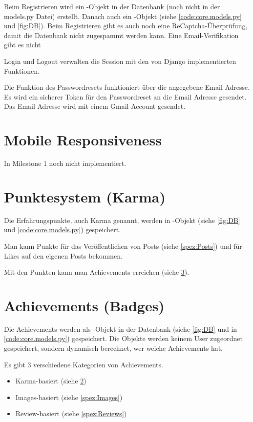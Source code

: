 Beim Registrieren wird ein -Objekt in der Datenbank (noch nicht in der
models.py Datei) erstellt. Danach auch ein -Objekt (siehe
\ref{code:core.models.py} und \ref{fig:DB}). Beim Registrieren gibt es auch noch
eine ReCaptcha-Überprüfung, damit die Datenbank nicht zugespammt werden kann. Eine Email-Verifikation gibt es nicht

Login und Logout verwalten die Session mit den von Django implementierten
Funktionen.

Die Funktion des Passwordresets funktioniert über die angegebene Email Adresse.
Es wird ein sicherer Token für den Passwordreset an die Email Adresse gesendet.
Das Email Adresse wird mit einem Gmail Account gesendet.

\section{Mobile Responsiveness} \label{spez:Mobile}

In Milestone 1 noch nicht implementiert.

\section{Punktesystem (Karma)} \label{spez:Karma}

Die Erfahrungspunkte, auch Karma genannt, werden in -Objekt (siehe
\ref{fig:DB} und \ref{code:core.models.py}) gespeichert.

Man kann Punkte für das Veröffentlichen von Posts (siehe \ref{spez:Posts}) und für
Likes auf den eigenen Posts bekommen.

Mit den Punkten kann man Achievements erreichen (siehe \ref{spez:Badges}).

\section{Achievements (Badges)} \label{spez:Badges}

Die Achievements werden als -Objekt in der Datenbank (siehe \ref{fig:DB} und in
\ref{code:core.models.py}) gespeichert. Die Objekte werden keinem User
zugeordnet gespeichert, sondern dynamisch berechnet, wer welche Achievements
hat.

Es gibt 3 verschiedene Kategorien von Achievements.
\begin{itemize}
    \item Karma-basiert (siehe \ref{spez:Karma})
    \item Images-basiert (siehe \ref{spez:Images})
    \item Review-basiert (siehe \ref{spez:Reviews})
\end{itemize}


